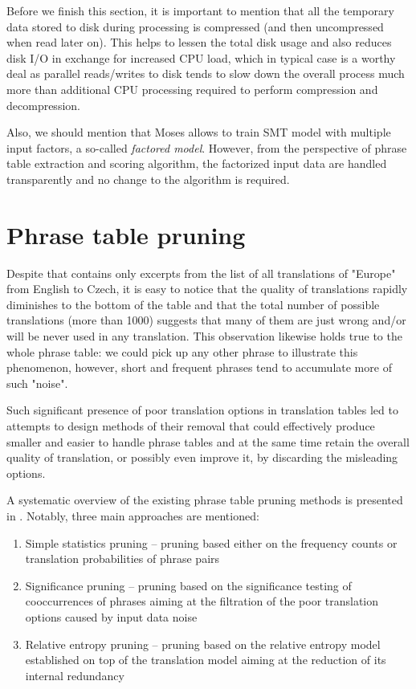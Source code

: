 Before we finish this section, it is important to mention that all
the temporary data stored to disk during processing is compressed
(and then uncompressed when read later on).
This helps to lessen the total disk usage and also reduces disk I/O in exchange for
increased CPU load, which in typical case is a worthy deal as parallel reads/writes
to disk tends to slow down the overall process much more than additional
CPU processing required to perform compression and decompression.

Also, we should mention that Moses allows to train SMT model with multiple input
factors, a so-called \emph{factored model}.
However, from the perspective of phrase table extraction and scoring algorithm,
the factorized input data are handled transparently and no change to the algorithm
is required.

\section{Phrase table pruning}
\label{sec:phrase-table-pruning}

Despite that  contains only excerpts from the list
of all translations of "Europe" from English to Czech, it is easy to notice
that the quality of translations rapidly diminishes to the bottom of the table
and that the total number of possible translations (more than 1000) suggests
that many of them are just wrong and/or will be never used in any translation.
This observation likewise holds true to the whole phrase table: we could pick up
any other phrase to illustrate this phenomenon, however, short and frequent
phrases tend to accumulate more of such "noise".

Such significant presence of poor translation options in translation tables led to
attempts to design methods of their removal that could effectively produce smaller and
easier to handle phrase tables and at the same time retain the overall quality of
translation, or possibly even improve it, by discarding the misleading options.

A systematic overview of the existing phrase table pruning methods is presented in
\citep{zens:systcomp}.
Notably, three main approaches are mentioned:
\begin{enumerate}
  \item Simple statistics pruning -- pruning based either on the frequency counts or
    translation probabilities of phrase pairs
  \item Significance pruning -- pruning based on the significance testing of
    cooccurrences of phrases aiming at the filtration of the poor translation options
    caused by input data noise
  \item Relative entropy pruning -- pruning based on the relative entropy model established
    on top of the translation model aiming at the reduction of its internal redundancy
\end{enumerate}

